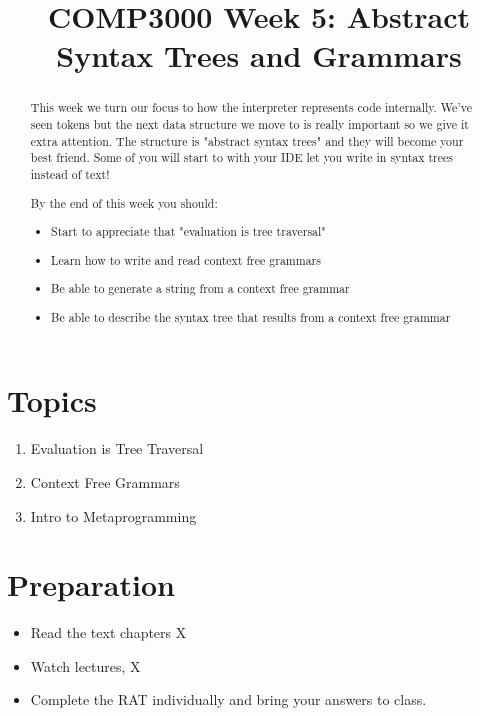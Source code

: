 \documentclass[twoside=false, DIV=14]{scrartcl}
\title{\color{redish} \vspace{-1em}COMP3000 Week 5: Abstract Syntax Trees and Grammars}
\begin{document}
{\color{blackish}\maketitle}\vspace{-7em}

\begin{abstract}

This week we turn our focus to how the interpreter represents code internally.  We've seen tokens but the next data structure we move to is really important so we give it extra attention.  The structure is "abstract syntax trees" and they will become your best friend.  Some of you will start to with your IDE let you write in syntax trees instead of text!

By the end of this week you should:
\begin{itemize}
    \item Start to appreciate that "evaluation is tree traversal"
    \item Learn how to write and read context free grammars
    \item Be able to generate a string from a context free grammar
    \item Be able to describe the syntax tree that results from a context free grammar
\end{itemize}
\end{abstract}
\section*{Topics}
\begin{enumerate}
\item Evaluation is Tree Traversal
\item Context Free Grammars
\item Intro to Metaprogramming
\end{enumerate}

\section*{Preparation}
\begin{itemize}
\item Read the text chapters X
\item Watch lectures, X
\item Complete the RAT individually and bring your answers to class.
\end{itemize}
\end{document}
